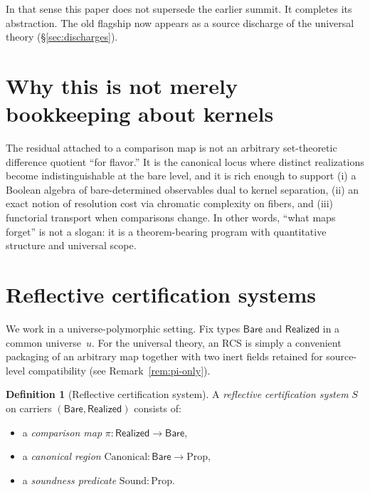 \documentclass[11pt,a4paper]{article}
\theoremstyle{plain}
\theoremstyle{definition}
\newtheorem{definition}[theorem]{Definition}
\theoremstyle{remark}
\newcommand{\Bare}{\mathsf{Bare}}
\newcommand{\Real}{\mathsf{Realized}}
\newcommand{\compare}{\pi}
\begin{document}
In that sense this paper does not supersede the earlier summit. It completes
its abstraction. The old flagship now appears as a source discharge of the
universal theory (\S\ref{sec:discharges}).

\section{Why this is not merely bookkeeping about kernels}\label{sec:not-bookkeeping}

The residual attached to a comparison map is not an arbitrary set-theoretic difference quotient ``for flavor.'' It is the canonical locus where distinct realizations become indistinguishable at the bare level, and it is rich enough to support (i) a Boolean algebra of bare-determined observables dual to kernel separation, (ii) an exact notion of resolution cost via chromatic complexity on fibers, and (iii) functorial transport when comparisons change. In other words, ``what maps forget'' is not a slogan: it is a theorem-bearing program with quantitative structure and universal scope.

\section{Reflective certification systems}\label{sec:rcs}

We work in a universe-polymorphic setting. Fix types $\Bare$ and $\Real$ in
a common universe~$u$. For the universal theory, an RCS is simply a
convenient packaging of an arbitrary map together with two inert fields
retained for source-level compatibility (see Remark~\ref{rem:pi-only}).

\begin{definition}[Reflective certification system]\label{def:rcs}
A \emph{reflective certification system} $S$ on carriers $(\Bare, \Real)$
consists of:
\begin{itemize}[nosep]
\item a \emph{comparison map} $\compare : \Real \to \Bare$,
\item a \emph{canonical region} $\mathrm{Canonical} : \Bare \to \mathrm{Prop}$,
\item a \emph{soundness predicate} $\mathrm{Sound} : \mathrm{Prop}$.
\end{itemize}
\end{definition}
\end{document}
